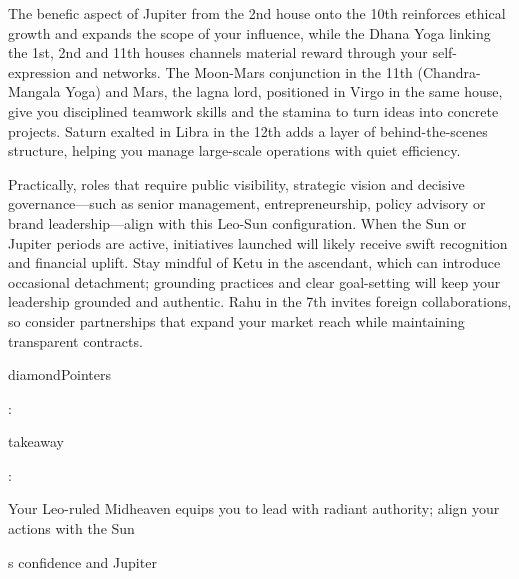 {\fontsize{9}{13}\selectfont The benefic aspect of Jupiter from the 2nd house onto the 10th reinforces ethical growth and expands the scope of your influence, while the Dhana Yoga linking the 1st, 2nd and 11th houses channels material reward through your self-expression and networks. The Moon-Mars conjunction in the 11th (Chandra-Mangala Yoga) and Mars, the lagna lord, positioned in Virgo in the same house, give you disciplined teamwork skills and the stamina to turn ideas into concrete projects. Saturn exalted in Libra in the 12th adds a layer of behind-the-scenes structure, helping you manage large-scale operations with quiet efficiency.}\par\vspace{1.8mm}

{\fontsize{9}{13}\selectfont Practically, roles that require public visibility, strategic vision and decisive governance---such as senior management, entrepreneurship, policy advisory or brand leadership---align with this Leo-Sun configuration. When the Sun or Jupiter periods are active, initiatives launched will likely receive swift recognition and financial uplift. Stay mindful of Ketu in the ascendant, which can introduce occasional detachment; grounding practices and clear goal-setting will keep your leadership grounded and authentic. Rahu in the 7th invites foreign collaborations, so consider partnerships that expand your market reach while maintaining transparent contracts.}\par\vspace{1.8mm}

{\fontsize{9}{13}\selectfont diamondPointers}\par\vspace{1.8mm}

{\fontsize{9}{13}\selectfont :}\par\vspace{1.8mm}

{\fontsize{9}{13}\selectfont takeaway}\par\vspace{1.8mm}

{\fontsize{9}{13}\selectfont :}\par\vspace{1.8mm}

{\fontsize{9}{13}\selectfont Your Leo-ruled Midheaven equips you to lead with radiant authority; align your actions with the Sun}\par\vspace{1.8mm}

{\fontsize{9}{13}\selectfont s confidence and Jupiter}\par\vspace{1.8mm}

